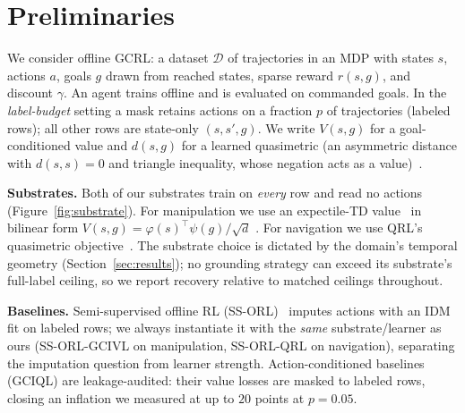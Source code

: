 \documentclass{article}
\theoremstyle{plain}
\theoremstyle{definition}
\begin{document}
\section{Preliminaries}
\label{sec:prelim}
We consider offline GCRL: a dataset $\mathcal{D}$ of trajectories in an MDP with states $s$, actions $a$, goals $g$ drawn from reached states, sparse reward $r(s,g)$, and discount $\gamma$. An agent trains offline and is evaluated on commanded goals. In the \emph{label-budget} setting a mask retains actions on a fraction $p$ of trajectories (labeled rows); all other rows are state-only $(s,s',g)$. We write $V(s,g)$ for a goal-conditioned value and $d(s,g)$ for a learned quasimetric (an asymmetric distance with $d(s,s)=0$ and triangle inequality, whose negation acts as a value)~\citep{qrl}.

\textbf{Substrates.} Both of our substrates train on \emph{every} row and read no actions (Figure~\ref{fig:substrate}). For manipulation we use an expectile-TD value~\citep{iql} in bilinear form $V(s,g)=\varphi(s)^{\!\top}\psi(g)/\sqrt{d}$ \citep{icvf}. For navigation we use QRL's quasimetric objective~\citep{qrl}. The substrate choice is dictated by the domain's temporal geometry (Section~\ref{sec:results}); no grounding strategy can exceed its substrate's full-label ceiling, so we report recovery relative to matched ceilings throughout.

\textbf{Baselines.} Semi-supervised offline RL (SS-ORL)~\citep{ssorl} imputes actions with an IDM fit on labeled rows; we always instantiate it with the \emph{same} substrate/learner as ours (SS-ORL-GCIVL on manipulation, SS-ORL-QRL on navigation), separating the imputation question from learner strength. Action-conditioned baselines (GCIQL) are leakage-audited: their value losses are masked to labeled rows, closing an inflation we measured at up to $20$ points at $p{=}0.05$.
\end{document}
